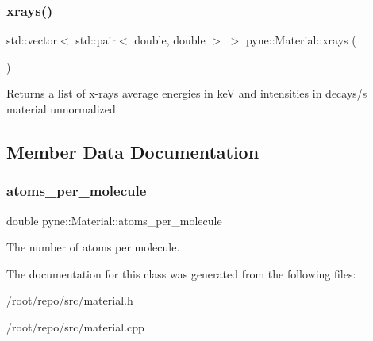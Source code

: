 \subsubsection{\texorpdfstring{xrays()}{xrays()}}
{\footnotesize\ttfamily std\+::vector$<$ std\+::pair$<$ double, double $>$ $>$ pyne\+::\+Material\+::xrays (\begin{DoxyParamCaption}{ }\end{DoxyParamCaption})}

Returns a list of x-\/rays average energies in keV and intensities in decays/s material unnormalized 

\subsection{Member Data Documentation}
\mbox{\label{classpyne_1_1_material_a7ddff1aaebc94bcda22d3422c093a756}} 
\subsubsection{\texorpdfstring{atoms\+\_\+per\+\_\+molecule}{atoms\_per\_molecule}}
{\footnotesize\ttfamily double pyne\+::\+Material\+::atoms\+\_\+per\+\_\+molecule}

The number of atoms per molecule. 

The documentation for this class was generated from the following files\+:\begin{DoxyCompactItemize}
\item 
/root/repo/src/material.\+h\item 
/root/repo/src/material.\+cpp\end{DoxyCompactItemize}
